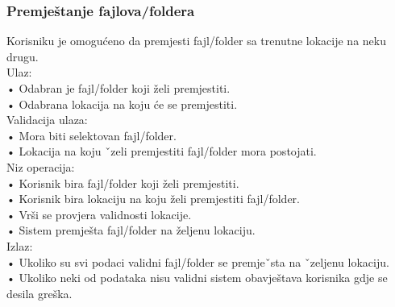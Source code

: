 \documentclass[utf8]{article}
\begin{document}
\subsubsection{Premještanje fajlova/foldera}
Korisniku je omogućeno da premjesti fajl/folder sa trenutne lokacije na neku drugu.\\
Ulaz:\\
•	Odabran je fajl/folder koji želi premjestiti. \\
•	Odabrana lokacija na koju će se premjestiti. \\
Validacija ulaza:\\
•	Mora biti selektovan fajl/folder.\\
•	Lokacija na koju ˇzeli premjestiti fajl/folder mora postojati. \\
Niz operacija:\\
•	Korisnik bira fajl/folder koji želi premjestiti.\\
•	Korisnik bira lokaciju na koju želi premjestiti fajl/folder. \\
•	Vrši se provjera validnosti lokacije.\\
•	Sistem premješta fajl/folder na željenu lokaciju.\\
Izlaz:\\
•	Ukoliko su svi podaci validni fajl/folder se premjeˇsta na ˇzeljenu lokaciju. \\
•	Ukoliko neki od podataka nisu validni sistem obavještava korisnika gdje se desila greška.\\
\end{document}
